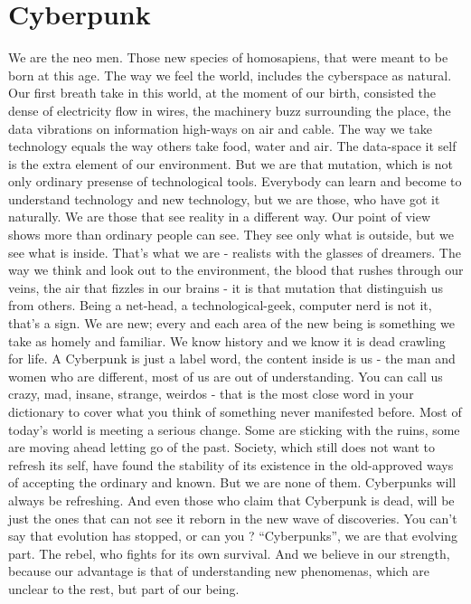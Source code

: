 \documentclass[letterpaper,12pt,english]{sphinxmanual}
\begin{document}
\section{Cyberpunk}
\label{2003:cyberpunk}
We are the neo men. Those new species of homosapiens, that were meant to be born at this age. The way we feel the world, includes the cyberspace as natural. Our first breath take in this world, at the moment of our birth, consisted the dense of electricity flow in wires, the machinery buzz surrounding the place, the data vibrations on information high-ways on air and cable. The way we take technology equals the way others take food, water and air. The data-space it self is the extra element of our environment. But we are that mutation, which is not only ordinary presense of technological tools. Everybody can learn and become to understand technology and new technology, but we are those, who have got it naturally. We are those that see reality in a different way. Our point of view shows more than ordinary people can see. They see only what is outside, but we see what is inside. That's what we are - realists with the glasses of dreamers. The way we think and look out to the environment, the blood that rushes through our veins, the air that fizzles in our brains - it is that mutation that distinguish us from others. Being a net-head, a technological-geek, computer nerd is not it, that's a sign. We are new; every and each area of the new being is something we take as homely and familiar. We know history and we know it is dead crawling for life. A Cyberpunk is just a label word, the content inside is us - the man and women who are different, most of us are out of understanding. You can call us crazy, mad, insane, strange, weirdos - that is the most close word in your dictionary to cover what you think of something never manifested before. Most of today's world is meeting a serious change. Some are sticking with the ruins, some are moving ahead letting go of the past. Society, which still does not want to refresh its self, have found the stability of its existence in the old-approved ways of accepting the ordinary and known. But we are none of them. Cyberpunks will always be refreshing. And even those who claim that Cyberpunk is dead, will be just the ones that can not see it reborn in the new wave of discoveries. You can't say that evolution has stopped, or can you ? ``Cyberpunks'', we are that evolving part. The rebel, who fights for its own survival. And we believe in our strength, because our advantage is that of understanding new phenomenas, which are unclear to the rest, but part of our being.
\end{document}
